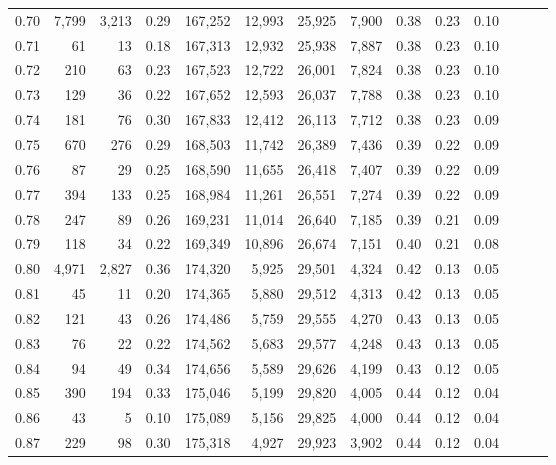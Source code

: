 \begin{tabular}{rrrrrrrrrrrrrr}
0.70 &   7,799 &  3,213 &  0.29 &  167,252 &   12,993 &  25,925 &   7,900 &  0.38 &  0.23 &      0.10 \\
0.71 &      61 &     13 &  0.18 &  167,313 &   12,932 &  25,938 &   7,887 &  0.38 &  0.23 &      0.10 \\
0.72 &     210 &     63 &  0.23 &  167,523 &   12,722 &  26,001 &   7,824 &  0.38 &  0.23 &      0.10 \\
0.73 &     129 &     36 &  0.22 &  167,652 &   12,593 &  26,037 &   7,788 &  0.38 &  0.23 &      0.10 \\
0.74 &     181 &     76 &  0.30 &  167,833 &   12,412 &  26,113 &   7,712 &  0.38 &  0.23 &      0.09 \\
0.75 &     670 &    276 &  0.29 &  168,503 &   11,742 &  26,389 &   7,436 &  0.39 &  0.22 &      0.09 \\
0.76 &      87 &     29 &  0.25 &  168,590 &   11,655 &  26,418 &   7,407 &  0.39 &  0.22 &      0.09 \\
0.77 &     394 &    133 &  0.25 &  168,984 &   11,261 &  26,551 &   7,274 &  0.39 &  0.22 &      0.09 \\
0.78 &     247 &     89 &  0.26 &  169,231 &   11,014 &  26,640 &   7,185 &  0.39 &  0.21 &      0.09 \\
0.79 &     118 &     34 &  0.22 &  169,349 &   10,896 &  26,674 &   7,151 &  0.40 &  0.21 &      0.08 \\
0.80 &   4,971 &  2,827 &  0.36 &  174,320 &    5,925 &  29,501 &   4,324 &  0.42 &  0.13 &      0.05 \\
0.81 &      45 &     11 &  0.20 &  174,365 &    5,880 &  29,512 &   4,313 &  0.42 &  0.13 &      0.05 \\
0.82 &     121 &     43 &  0.26 &  174,486 &    5,759 &  29,555 &   4,270 &  0.43 &  0.13 &      0.05 \\
0.83 &      76 &     22 &  0.22 &  174,562 &    5,683 &  29,577 &   4,248 &  0.43 &  0.13 &      0.05 \\
0.84 &      94 &     49 &  0.34 &  174,656 &    5,589 &  29,626 &   4,199 &  0.43 &  0.12 &      0.05 \\
0.85 &     390 &    194 &  0.33 &  175,046 &    5,199 &  29,820 &   4,005 &  0.44 &  0.12 &      0.04 \\
0.86 &      43 &      5 &  0.10 &  175,089 &    5,156 &  29,825 &   4,000 &  0.44 &  0.12 &      0.04 \\
0.87 &     229 &     98 &  0.30 &  175,318 &    4,927 &  29,923 &   3,902 &  0.44 &  0.12 &      0.04 \\

\end{tabular}
